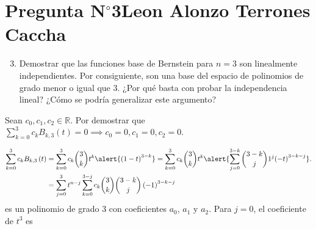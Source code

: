 \section{Pregunta N$^{\circ}$3\qquad Leon Alonzo Terrones Caccha}

\begin{frame}
    \begin{enumerate}\setcounter{enumi}{2}
        \item
              Demostrar que las funciones base de Bernstein para
              $n=3$ son linealmente independientes.
              Por consiguiente, son una base del espacio de
              polinomios de grado menor o igual que $3$.
              ¿Por qué basta con probar la independencia lineal?
              ¿Cómo se podría generalizar este argumento?
    \end{enumerate}

    \begin{solution}
        Sean $c_{0},c_{1},c_{2}\in\mathbb{R}$.
        Por demostrar que
        \begin{math}
            \sum\limits_{k=0}^{3}
            c_{k}
            B_{k,3}\left(t\right)=
            0\implies
            c_{0}=0,
            c_{1}=0,
            c_{2}=0
        \end{math}.

        \begin{align*}
            \sum_{k=0}^{3}
            c_{k}
            B_{k,3}\left(t\right)
             & =
            \sum_{k=0}^{3}
            c_{k}
            \binom{3}{k}
            t^{k}
            \alert{
                {\left(1-t\right)}^{3-k}
            }
            =
            \sum_{k=0}^{3}
            c_{k}\binom{3}{k}t^k
            \alert{
                \sum_{j=0}^{3-k}
                \binom{3-k}{j}
                1^{j}
                    {\left(-t\right)}^{3-k-j}
            }.
            \\
             & =
            \sum_{j=0}^{3}
            t^{n-j}
            \sum_{k=0}^{3-j}
            c_{k}
            \binom{3}{k}
            \binom{3-k}{j}
            \left(-1\right)^{3-k-j}
        \end{align*}
        es un polinomio de grado $3$ con coeficientes $a_{0}$,
        $a_{1}$ y $a_{2}$.
        Para $j=0$, el coeficiente de $t^{3}$ es


\end{solution}
\end{frame}
